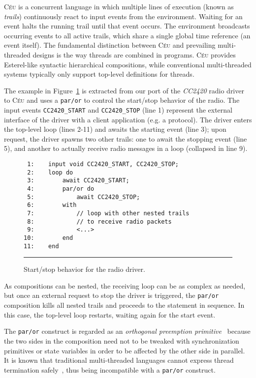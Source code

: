 \documentclass[10pt]{sensys-proc}
\newcommand{\CEU}{\textsc{C\'{e}u}\xspace}
\newcommand{\code}[1] {{\small{\texttt{#1}}}}
\begin{document}
\CEU{} is a concurrent language in which multiple lines of execution (known as 
\emph{trails}) continuously react to input events from the environment.
Waiting for an event halts the running trail until that event occurs.
The environment broadcasts occurring events to all active trails, which share a 
single global time reference (an event itself).
%
%
The fundamental distinction between \CEU and prevailing multi-threaded designs 
is the way threads are combined in programs.
\CEU provides Esterel-like syntactic hierarchical compositions, while 
conventional multi-threaded systems typically only support top-level 
definitions for threads.

The example in Figure~\ref{lst.radio} is extracted from our port of the 
\emph{CC2420} radio driver~\cite{wsn.teps} to \CEU and uses a \code{par/or} to 
control the start/stop behavior of the radio.
The input events \code{CC2420\_START} and \code{CC2420\_STOP} (line 1) 
represent the external interface of the driver with a client application (e.g.  
a protocol).
The driver enters the top-level loop (lines 2-11) and awaits the starting event 
(line 3);
upon request, the driver spawns two other trails:
one to await the stopping event (line 5),
and another to actually receive radio messages in a loop (collapsed in line 9).
%
\begin{figure}[t]
{\small
\begin{verbatim}
 1:    input void CC2420_START, CC2420_STOP;
 2:    loop do
 3:        await CC2420_START;
 4:        par/or do
 5:            await CC2420_STOP;
 6:        with
 7:            // loop with other nested trails
 8:            // to receive radio packets
 9:            <...>
10:        end
11:    end
\end{verbatim}
}%
\rule{8.5cm}{0.37pt}
\caption{ Start/stop behavior for the radio driver.
\label{lst.radio}
}
\end{figure}
%
As compositions can be nested, the receiving loop can be as complex as needed, 
but once an external request to stop the driver is triggered, the \code{par/or} 
composition kills all nested trails and proceeds to the statement in sequence.
In this case, the top-level loop restarts, waiting again for the start event.

The \code{par/or} construct is regarded as an \emph{orthogonal preemption 
primitive}~\cite{esterel.preemption} because the two sides in the composition 
need not to be tweaked with synchronization primitives or state variables in
order to be affected by the other side in parallel.
It is known that traditional multi-threaded languages cannot express thread 
termination safely~\cite{esterel.preemption,sync_async.threadsstop}, thus being 
incompatible with a \code{par/or} construct.
\end{document}
